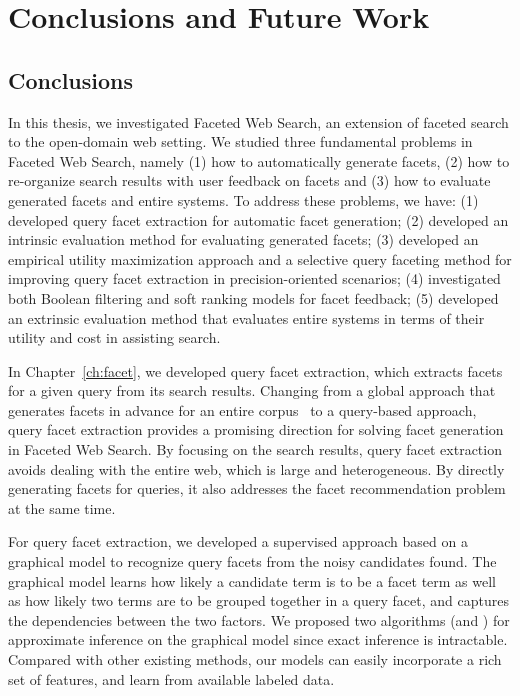 \chapter{Conclusions and Future Work}
\label{ch:conclusions}
\section{Conclusions}
In this thesis, we investigated Faceted Web Search, an extension of faceted search to the open-domain web setting. We studied three fundamental problems in Faceted Web Search, namely (1) how to automatically generate facets, (2) how to re-organize search results with user feedback on facets and (3) how to evaluate generated facets and entire systems. To address these problems, we have: (1) developed query facet extraction for automatic facet generation; (2) developed an intrinsic evaluation method for evaluating generated facets; (3) developed an empirical utility maximization approach and a selective query faceting method for improving query facet extraction in precision-oriented scenarios; (4) investigated both Boolean filtering and soft ranking models for facet feedback; (5) developed an extrinsic evaluation method that evaluates entire systems in terms of their utility and cost in assisting search.

In Chapter~\ref{ch:facet}, we developed query facet extraction, which extracts facets for a given query from its search results. Changing from a global approach that generates facets in advance for an entire corpus~\cite{stoica2007automating,dakka2008automatic} to a query-based approach, query facet extraction provides a promising direction for solving facet generation in Faceted Web Search.
By focusing on the search results, query facet extraction avoids dealing with the entire web, which is large and heterogeneous. By directly generating facets for queries, it also addresses the facet recommendation problem at the same time.
 
For query facet extraction, we developed a supervised approach based on a graphical model to recognize query facets from the noisy candidates found. The graphical model learns how likely a candidate term is to be a facet term as well as how likely two terms are to be grouped together in a query facet, and captures the dependencies between the two factors. We proposed two algorithms (\QFI and \QFJ) for approximate inference on the graphical model since exact inference is intractable. Compared with other existing methods, our models can easily incorporate a rich set of features, and learn from available labeled data.

